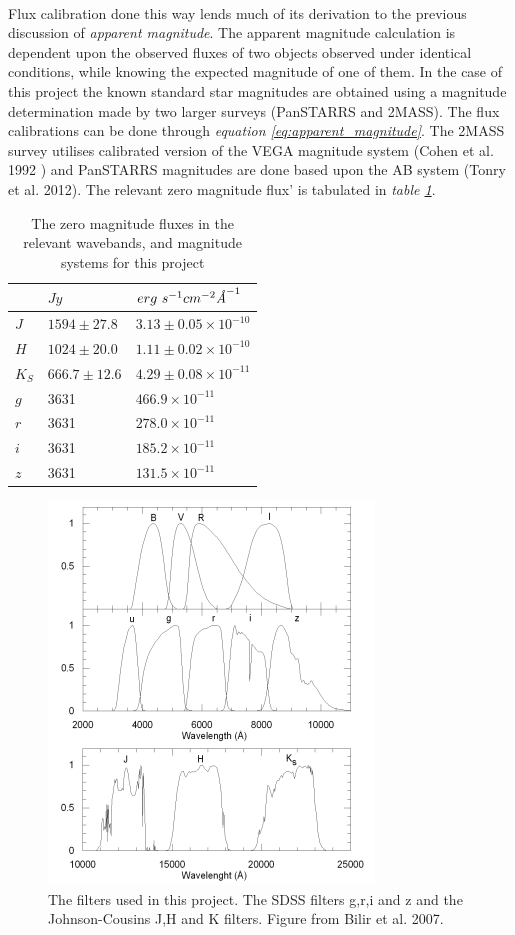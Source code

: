 \documentclass[a4paper, 12pt, twoside]{article}
\begin{document}
\\
Flux calibration done this way lends much of its derivation to the previous discussion of \emph{apparent magnitude}. The apparent magnitude calculation is dependent upon the observed fluxes of two objects observed under identical conditions, while knowing the expected magnitude of one of them. In the case of this project the known standard star magnitudes are obtained using a magnitude determination made by two larger surveys (PanSTARRS and 2MASS). The flux calibrations can be done through \emph{equation \ref{eq:apparent_magnitude}}. The 2MASS survey utilises calibrated version of the VEGA magnitude system (Cohen et al. 1992\cite{Cohen1992} \cite{2MASS_vega}) and PanSTARRS magnitudes are done based upon the AB system (Tonry et al. 2012\cite{Tonry2012}). The relevant zero magnitude flux' is tabulated in \emph{table \ref{tab:zero_mag_tab}}.\\
\begin{table}
\caption{The zero magnitude fluxes in the relevant wavebands, and magnitude systems for this project}
\label{tab:zero_mag_tab}
\centering
\begin{tabular}{|l||l|l|}
\hline
	 & $Jy$ & $erg\ s^{-1}cm^{-2}\text{\emph{Å}}^{-1}$\\
	 \hline
	 \hline
	$J$ & $1594\pm 27.8$ \cite{2MASS_vega}& $3.13\pm 0.05 \times 10^{-10}$\\
	\hline
	$H$ & $1024\pm 20.0$ \cite{2MASS_vega}& $1.11\pm 0.02 \times 10^{-10}$\\
	\hline
	$K_S$ & $666.7\pm 12.6$ \cite{2MASS_vega}& $4.29\pm 0.08 \times 10^{-11}$\\
	\hline
	$g$ & 3631\cite{AST_DATA} & $466.9 \times 10^{-11}$\\
	\hline
	$r$ & 3631\cite{AST_DATA} & $278.0 \times 10^{-11}$\\
	\hline
	$i$ & 3631\cite{AST_DATA} & $185.2 \times 10^{-11}$\\
	\hline
	$z$ & 3631\cite{AST_DATA} & $131.5 \times 10^{-11}$\\
	\hline
\end{tabular}
\end{table}

\begin{figure}[t!]
\centering
\includegraphics[width=0.5\linewidth]{Figure/filters.png}
\caption{The filters used in this project. The SDSS filters g,r,i and z and the Johnson-Cousins J,H and K filters. Figure from Bilir et al. 2007.}
\label{fig:filters}
\end{figure}
\end{document}
